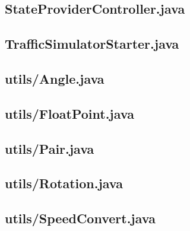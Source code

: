 \subsection{StateProviderController.java}

\newpage
\subsection{TrafficSimulatorStarter.java}

\newpage
\subsection{utils/Angle.java}

\newpage
\subsection{utils/FloatPoint.java}

\newpage
\subsection{utils/Pair.java}

\newpage
\subsection{utils/Rotation.java}

\newpage
\subsection{utils/SpeedConvert.java}

